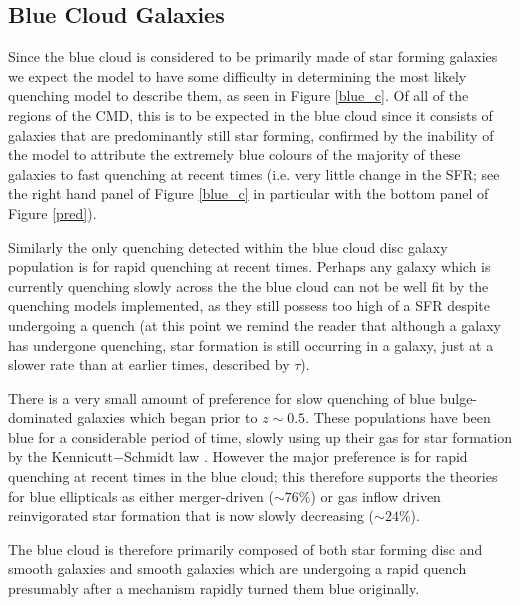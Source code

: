 \documentclass[useAMS,usenatbib]{mn2e}
\def\changed    {\color{titlecol} }
\begin{document}
\subsection{Blue Cloud Galaxies}\label{bc}


Since the blue cloud is considered to be primarily made of star forming galaxies we expect the model to have some difficulty in determining the most likely quenching model to describe them, as seen in Figure \ref{blue_c}. Of all of the regions of the CMD, this is to be expected in the blue cloud since it consists of galaxies that are predominantly still star forming, confirmed by the inability of the model to attribute the extremely blue colours of the majority of these galaxies to fast quenching at recent times (i.e. very little change in the SFR; see the right hand panel of Figure \ref{blue_c} in particular with the bottom panel of Figure \ref{pred}).

{\changed Similarly the only quenching detected within the blue cloud disc galaxy population is for rapid quenching at recent times. Perhaps any galaxy which is currently quenching slowly across the the blue cloud can not be well fit by the quenching models implemented, as they still possess too high of a SFR despite undergoing a quench (at this point we remind the reader that although a galaxy has undergone quenching, star formation is still occurring in a galaxy, just at a slower rate than at earlier times, described by $\tau$).} 


{\changed There is a very small amount of  preference for slow quenching of blue bulge-dominated galaxies which began prior to $z \sim 0.5 $. These populations have been blue for a considerable period of time, slowly using up their gas for star formation by the Kennicutt$-$Schmidt law \citep{Schmidt59, Kennicutt97}. However the major preference is for rapid quenching at recent times in the blue cloud; this therefore supports the theories for blue ellipticals as either merger-driven ($\sim76\%$) or gas inflow driven reinvigorated star formation that is now slowly decreasing ($\sim24\%$).}

The blue cloud is therefore primarily composed of both star forming disc and smooth galaxies and smooth galaxies which {\changed are undergoing a rapid quench presumably after a mechanism rapidly turned them blue originally}. 
\end{document}
